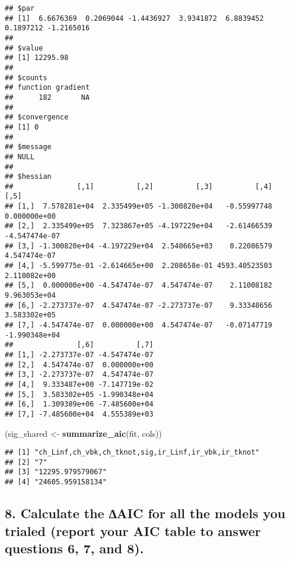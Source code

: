 \documentclass[
]{article}
\newenvironment{Shaded}{\begin{snugshade}}{\end{snugshade}}
\newcommand{\KeywordTok}[1]{\textcolor[rgb]{0.13,0.29,0.53}{\textbf{#1}}}
\newcommand{\NormalTok}[1]{#1}
\newcommand{\StringTok}[1]{\textcolor[rgb]{0.31,0.60,0.02}{#1}}
\begin{document}
\begin{verbatim}
## $par
## [1]  6.6676369  0.2069044 -1.4436927  3.9341872  6.8839452  0.1897212 -1.2165016
## 
## $value
## [1] 12295.98
## 
## $counts
## function gradient 
##      182       NA 
## 
## $convergence
## [1] 0
## 
## $message
## NULL
## 
## $hessian
##               [,1]          [,2]          [,3]          [,4]          [,5]
## [1,]  7.578281e+04  2.335499e+05 -1.300820e+04   -0.55997748  0.000000e+00
## [2,]  2.335499e+05  7.323867e+05 -4.197229e+04   -2.61466539 -4.547474e-07
## [3,] -1.300820e+04 -4.197229e+04  2.540665e+03    0.22086579  4.547474e-07
## [4,] -5.599775e-01 -2.614665e+00  2.208658e-01 4593.40523503  2.110082e+00
## [5,]  0.000000e+00 -4.547474e-07  4.547474e-07    2.11008182  9.963053e+04
## [6,] -2.273737e-07  4.547474e-07 -2.273737e-07    9.33348656  3.583302e+05
## [7,] -4.547474e-07  0.000000e+00  4.547474e-07   -0.07147719 -1.990348e+04
##               [,6]          [,7]
## [1,] -2.273737e-07 -4.547474e-07
## [2,]  4.547474e-07  0.000000e+00
## [3,] -2.273737e-07  4.547474e-07
## [4,]  9.333487e+00 -7.147719e-02
## [5,]  3.583302e+05 -1.990348e+04
## [6,]  1.309389e+06 -7.485600e+04
## [7,] -7.485600e+04  4.555389e+03
\end{verbatim}

\begin{Shaded}
\begin{Highlighting}[]
\NormalTok{(sig\_shared \textless{}{-}}\StringTok{ }\KeywordTok{summarize\_aic}\NormalTok{(fit, cols))}
\end{Highlighting}
\end{Shaded}

\begin{verbatim}
## [1] "ch_Linf,ch_vbk,ch_tknot,sig,ir_Linf,ir_vbk,ir_tknot"
## [2] "7"                                                  
## [3] "12295.979579067"                                    
## [4] "24605.959158134"
\end{verbatim}

\hypertarget{calculate-the-aic-for-all-the-models-you-trialed-report-your-aic-table-to-answer-questions-6-7-and-8.}{%
\subsection{8. Calculate the ∆AIC for all the models you trialed (report
your AIC table to answer questions 6, 7, and
8).}\label{calculate-the-aic-for-all-the-models-you-trialed-report-your-aic-table-to-answer-questions-6-7-and-8.}}
\end{document}
